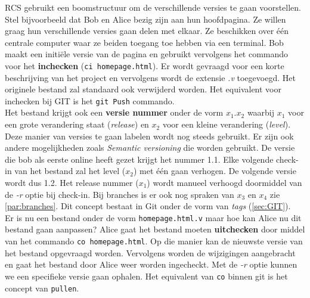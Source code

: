RCS gebruikt een boomstructuur om de verschillende versies te gaan voorstellen. Stel bijvoorbeeld dat Bob en Alice bezig zijn aan hun hoofdpagina. Ze willen graag hun verschillende versies gaan delen met elkaar. Ze beschikken over één centrale computer waar ze beiden toegang toe hebben via een terminal. Bob maakt een initiële versie van de pagina en gebruikt vervolgens het commando voor het \textbf{inchecken} (\Verb+ci homepage.html+). Er wordt gevraagd voor een korte beschrijving van het project en vervolgens wordt de extensie \textit{.v} toegevoegd. Het originele bestand zal standaard ook verwijderd worden. Het equivalent voor inchecken bij GIT is het \verb+git Push+ commando.\\

Het bestand krijgt ook een \textbf{versie nummer} onder de vorm $x_1.x_2$ waarbij $x_1$ voor een grote verandering staat (\textit{release}) en $x_2$ voor een kleine verandering (\textit{level}). Deze manier van versies te gaan labelen wordt nog steeds gebruikt. Er zijn ook andere mogelijkheden zoals \textit{Semantic versioning} die worden gebruikt. De versie die bob als eerste online heeft gezet krijgt het nummer 1.1. Elke volgende check-in van het bestand zal het level ($x_2$) met één gaan verhogen. De volgende versie wordt dus 1.2. Het release nummer ($x_1$) wordt manueel verhoogd doormiddel van de \textit{-r} optie bij check-in. Bij branches is er ook nog spraken van $x_3$ en $x_4$ zie \ref{par:branches}. Dit concept bestaat in Git onder de vorm van \textit{tags} (\ref{sec:GIT}).\\

Er is nu een bestand onder de vorm \Verb+homepage.html.v+ maar hoe kan Alice nu dit bestand gaan aanpassen? Alice gaat het bestand moeten \textbf{uitchecken} door middel van het commando  \verb+co homepage.html+. Op die manier kan de nieuwste versie van het bestand opgevraagd worden. Vervolgens worden de wijzigingen aangebracht en gaat het bestand door Alice weer worden ingecheckt. Met de \textit{-r} optie kunnen we een specifieke versie gaan ophalen. Het equivalent van \verb+co+ binnen git is het concept van \verb+pullen+.\\


